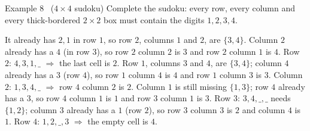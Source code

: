 \begin{exbox}{Example 8 \ ($4\times 4$ sudoku)}
Complete the sudoku: every row, every column and every thick-bordered $2\times 2$ box must contain the digits $1, 2, 3, 4$.
\begin{center}\end{center}
\guide
{}
It already has $2, 1$ in row $1$, so row $2$, columns $1$ and $2$, are $\{3, 4\}$. Column $2$ already has a $4$ (in row $3$), so
row $2$ column $2$ is $3$ and row $2$ column $1$ is $4$.
Row $2$: $4, 3, 1, \_$ $\Rightarrow$ the last cell is $2$. Row $1$, columns $3$ and $4$, are $\{3, 4\}$; column $4$ already has a $3$
(row $4$), so row $1$ column $4$ is $4$ and row $1$ column $3$ is $3$.
Column $2$: $1, 3, 4, \_$ $\Rightarrow$ row $4$ column $2$ is $2$. Column $1$ is still missing $\{1, 3\}$; row $4$ already has a $3$, so
row $4$ column $1$ is $1$ and row $3$ column $1$ is $3$.
Row $3$: $3, 4, \_, \_$ needs $\{1, 2\}$; column $3$ already has a $1$ (row $2$), so row $3$ column $3$ is $2$ and column $4$ is $1$. Row $4$: $1, 2, \_, 3$ $\Rightarrow$ the empty cell is $4$.
\begin{center}\end{center}
\end{exbox}

\clearpage
{}

